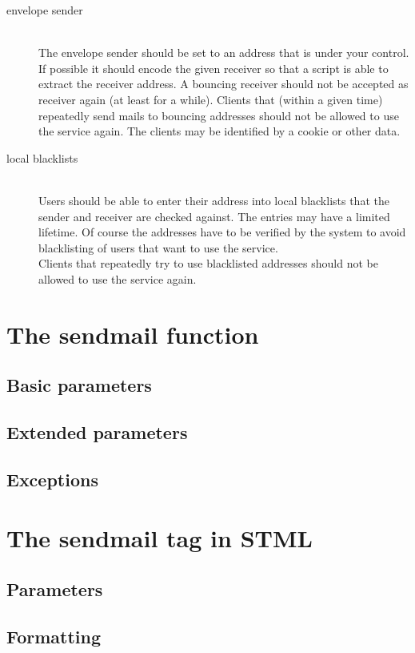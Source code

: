 \documentclass{article}
\begin{document}
\begin{description}
  \item[envelope sender] ~ \\
       The envelope sender should be set to an address that is under
       your control. If possible it should encode the given receiver
       so that a script is able to extract the receiver address.
       A bouncing receiver should not be accepted as receiver again
       (at least for a while). Clients that (within a given time)
       repeatedly send mails to bouncing addresses should not be
       allowed to use the service again.
       The clients may be identified by a cookie or other data.
  \item[local blacklists] ~ \\
       Users should be able to enter their address into local blacklists
       that the sender and receiver are checked against. The entries
       may have a limited lifetime. Of course the addresses have to be
       verified by the system to avoid blacklisting of users that want
       to use the service.\\
       Clients that repeatedly try to use blacklisted addresses should
       not be allowed to use the service again.

\end{description}


\section{The sendmail function}
\subsection{Basic parameters}
\subsection{Extended parameters}
\subsection{Exceptions}

\section{The sendmail tag in STML}
\subsection{Parameters}
\subsection{Formatting}
\end{document}
